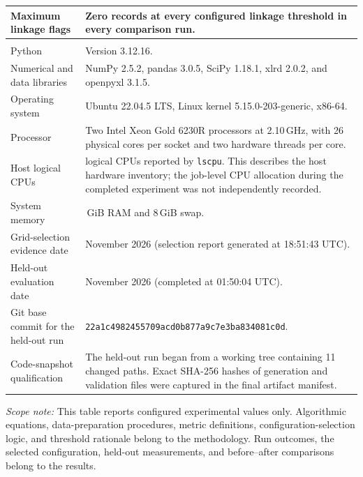 \documentclass[12pt,a4paper]{article}
\begin{document}
\begin{longtable}{
        @{}
        >{\raggedright\arraybackslash}p{}
        >{\raggedright\arraybackslash}p{}
        @{}
    }
    Maximum linkage flags
    & Zero records at every configured linkage threshold in every comparison
    run. \\

    \midrule
    \multicolumn{2}{@{}l}{\textbf{Software and provenance settings}}\\*
    \midrule

    Python
    & Version 3.12.16. \\

    Numerical and data libraries
    & NumPy 2.5.2, pandas 3.0.5, SciPy 1.18.1, xlrd 2.0.2,
    and openpyxl 3.1.5. \\

    Operating system
    & Ubuntu 22.04.5 LTS, Linux kernel 5.15.0-203-generic, x86-64. \\

    Processor
    & Two Intel Xeon Gold 6230R processors at 2.10\,GHz, with 26 physical
    cores per socket and two hardware threads per core. \\

    Host logical CPUs
    & 104 logical CPUs reported by \texttt{lscpu}. This describes the host
    hardware inventory; the job-level CPU allocation during the completed
    experiment was not independently recorded. \\

    System memory
    & 93\,GiB RAM and 8\,GiB swap. \\

    Grid-selection evidence date
    & 7 November 2026 (selection report generated at 18:51:43 UTC). \\

    Held-out evaluation date
    & 8 November 2026 (completed at 01:50:04 UTC). \\

    Git base commit for the held-out run
    & \texttt{22a1c4982455709acd0b877a9c7e3ba834081c0d}. \\

    Code-snapshot qualification
    & The held-out run began from a working tree containing 11 changed paths.
    Exact SHA-256 hashes of generation and validation files were captured in
    the final artifact manifest. \\

\end{longtable}

\noindent
\textit{Scope note:}
This table reports configured experimental values only. Algorithmic equations,
data-preparation procedures, metric definitions, configuration-selection logic,
and threshold rationale belong to the methodology. Run outcomes, the selected
configuration, held-out measurements, and before--after comparisons belong to
the results.

\endgroup
\end{document}
